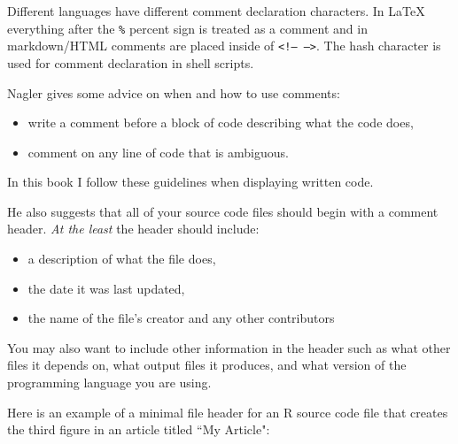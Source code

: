 {Different languages have different comment declaration characters. In LaTeX everything after the {\tt{\%}} percent sign is treated as a comment and in markdown/HTML comments are placed inside of {\tt{\textless !-- --\textgreater}}. The hash character is used for comment declaration in shell scripts.

Nagler \citeyearpar[491]{Nagler1995} gives some advice on when and how to use comments:

\begin{itemize}
    \item write a comment before a block of code describing what the code does,
    \item comment on any line of code that is ambiguous.
\end{itemize}

\noindent In this book I follow these guidelines when displaying written code. 

He also suggests that all of your source code files should begin with a comment header. {\emph{At the least}} the header should include:

\begin{itemize}
    \item a description of what the file does,
    \item the date it was last updated,
    \item the name of the file's creator and any other contributors
\end{itemize}

\noindent You may also want to include other information in the header such as what other files it depends on, what output files it produces, and what version of the programming language you are using. 

Here is an example of a minimal file header for an R source code file that creates the third figure in an article titled ``My Article":

\begin{knitrout}
\color{fgcolor}\begin{kframe}
\begin{alltt}
\hlcomment{##################}
\hlcomment{##################}
\end{alltt}
\end{kframe}
\end{knitrout}


}

